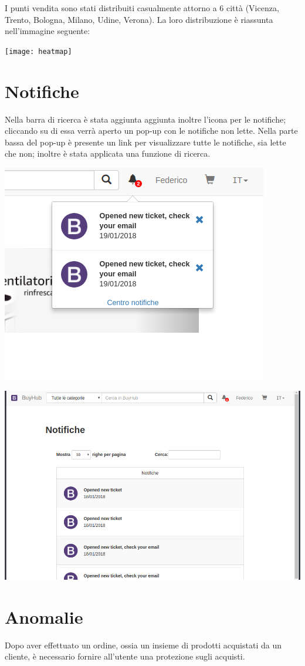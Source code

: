 I punti vendita sono stati distribuiti casualmente attorno a 6 città (Vicenza, Trento, Bologna, Milano, Udine, Verona). La loro distribuzione è riassunta nell'immagine seguente:
\begin{center}
  \texttt{[image: heatmap]}
\end{center}

\chapter{Notifiche}
Nella barra di ricerca è stata aggiunta aggiunta inoltre l'icona per le notifiche; cliccando su di essa verrà aperto un pop-up con le notifiche non lette.
Nella parte bassa del pop-up è presente un link per visualizzare tutte le notifiche, sia lette che non; inoltre è stata applicata una funzione di ricerca.

\begin{center}
\includegraphics[width=0.5\linewidth]{img/notificationpopup7}
\end{center}

\begin{center}
\includegraphics[width=0.7\linewidth]{img/notifications}
\end{center}



\chapter{Anomalie}
Dopo aver effettuato un ordine, ossia un insieme di prodotti acquistati da un cliente, è necessario fornire all'utente una protezione sugli acquisti.

